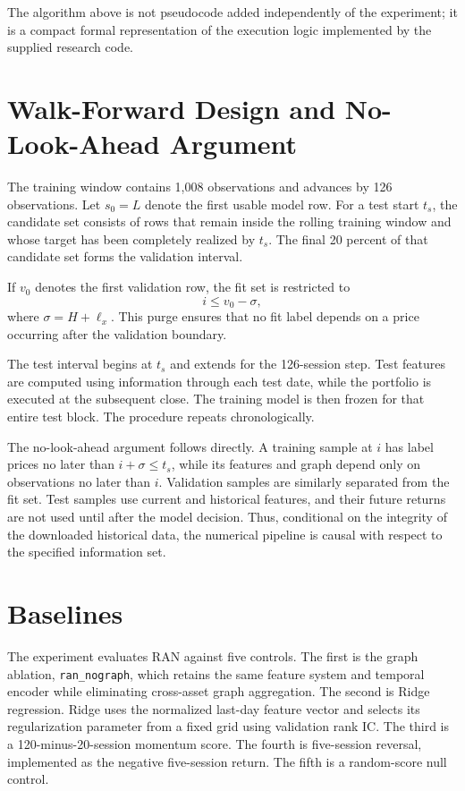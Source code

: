 \documentclass[10pt]{article}
\begin{document}
The algorithm above is not pseudocode added independently of the experiment; it is a compact formal representation of the execution logic implemented by the supplied research code.

\section{Walk-Forward Design and No-Look-Ahead Argument}

The training window contains 1,008 observations and advances by 126 observations. Let $s_0=L$ denote the first usable model row. For a test start $t_s$, the candidate set consists of rows that remain inside the rolling training window and whose target has been completely realized by $t_s$. The final 20 percent of that candidate set forms the validation interval.

If $v_0$ denotes the first validation row, the fit set is restricted to
\begin{equation}
i\leq v_0-\sigma,
\end{equation}
where $\sigma=H+\ell_x$. This purge ensures that no fit label depends on a price occurring after the validation boundary.

The test interval begins at $t_s$ and extends for the 126-session step. Test features are computed using information through each test date, while the portfolio is executed at the subsequent close. The training model is then frozen for that entire test block. The procedure repeats chronologically.

The no-look-ahead argument follows directly. A training sample at $i$ has label prices no later than $i+\sigma\leq t_s$, while its features and graph depend only on observations no later than $i$. Validation samples are similarly separated from the fit set. Test samples use current and historical features, and their future returns are not used until after the model decision. Thus, conditional on the integrity of the downloaded historical data, the numerical pipeline is causal with respect to the specified information set.

\section{Baselines}

The experiment evaluates RAN against five controls. The first is the graph ablation, \texttt{ran\_nograph}, which retains the same feature system and temporal encoder while eliminating cross-asset graph aggregation. The second is Ridge regression. Ridge uses the normalized last-day feature vector and selects its regularization parameter from a fixed grid using validation rank IC. The third is a 120-minus-20-session momentum score. The fourth is five-session reversal, implemented as the negative five-session return. The fifth is a random-score null control.
\end{document}

